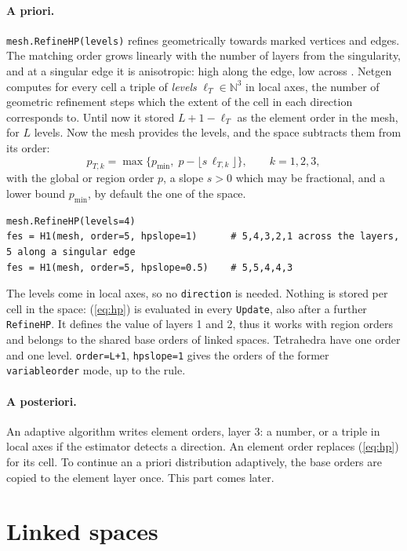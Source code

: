 \documentclass[10pt,a4paper]{article}
\newcommand{\code}[1]{\texttt{#1}}
\begin{document}
\paragraph{A priori.} \code{mesh.RefineHP(levels)} refines geometrically towards marked vertices and edges. The matching order grows linearly with the number of layers from the singularity, and at a singular edge it is anisotropic: high along the edge, low across \cite{s98}. Netgen computes for every cell a triple of \emph{levels} $\ell_T \in \mathbb{N}^3$ in local axes, the number of geometric refinement steps which the extent of the cell in each direction corresponds to. Until now it stored $L+1-\ell_T$ as the element order in the mesh, for $L$ levels. Now the mesh provides the levels, and the space subtracts them from its order:
\begin{equation}\label{eq:hp}
p_{T,k} = \max \{ p_{\min}, \; p - \lfloor s \, \ell_{T,k} \rfloor \}, \qquad k = 1,2,3,
\end{equation}
with the global or region order $p$, a slope $s > 0$ which may be fractional, and a lower bound $p_{\min}$, by default the one of the space.
\begin{lstlisting}
mesh.RefineHP(levels=4)
fes = H1(mesh, order=5, hpslope=1)      # 5,4,3,2,1 across the layers, 5 along a singular edge
fes = H1(mesh, order=5, hpslope=0.5)    # 5,5,4,4,3
\end{lstlisting}
The levels come in local axes, so no \code{direction} is needed. Nothing is stored per cell in the space: (\ref{eq:hp}) is evaluated in every \code{Update}, also after a further \code{RefineHP}. It defines the value of layers 1 and 2, thus it works with region orders and belongs to the shared base orders of linked spaces. Tetrahedra have one order and one level. \code{order=L+1}, \code{hpslope=1} gives the orders of the former \code{variableorder} mode, up to the rule.

\paragraph{A posteriori.} An adaptive algorithm writes element orders, layer 3: a number, or a triple in local axes if the estimator detects a direction. An element order replaces (\ref{eq:hp}) for its cell. To continue an a priori distribution adaptively, the base orders are copied to the element layer once. This part comes later.

\section{Linked spaces}
\end{document}
